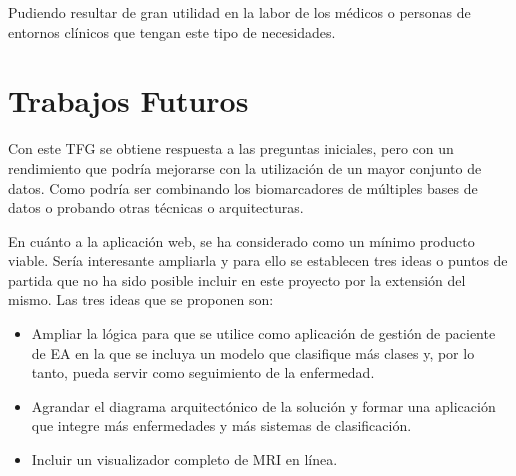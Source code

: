 Pudiendo resultar de gran utilidad en la labor de los médicos o personas de entornos clínicos que tengan este tipo de
necesidades.


\section{Trabajos Futuros}\label{sec:trabajos-futuros}
Con este TFG se obtiene respuesta a las preguntas iniciales, pero con un rendimiento que podría mejorarse con la
utilización de un mayor conjunto de datos.
Como podría ser combinando los biomarcadores de múltiples bases de datos o probando otras técnicas o arquitecturas.

En cuánto a la aplicación web, se ha considerado como un mínimo producto viable.
Sería interesante ampliarla y para ello se establecen tres ideas o puntos de partida que no ha sido posible incluir en
este proyecto por la extensión del mismo.
Las tres ideas que se proponen son:
\begin{itemize}
    \item Ampliar la lógica para que se utilice como aplicación de gestión de paciente de EA en la que se incluya un
    modelo que clasifique más clases y, por lo tanto, pueda servir como seguimiento de la enfermedad.
    \item Agrandar el diagrama arquitectónico de la solución y formar una aplicación que integre más enfermedades y más
    sistemas de clasificación.
    \item Incluir un visualizador completo de MRI en línea.
\end{itemize}
